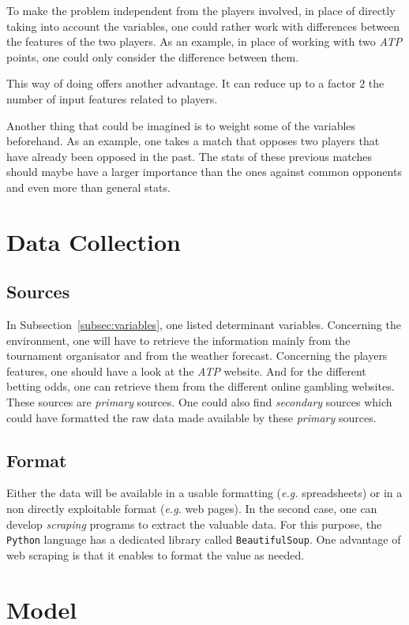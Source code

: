 \documentclass[a4paper,9pt]{report}
\theoremstyle{mytheor}
\begin{document}
To make the problem independent from the players involved, in place
of directly taking into account the variables, one could rather work
with differences between the features of the two players.
As an example, in place of working with two \textit{ATP} points,
one could only consider the difference between them.

This way of doing offers another advantage. It can reduce up to a factor $2$
the number of input features related to players.

Another thing that could be imagined is to weight some of the variables beforehand.
As an example, one takes a match that opposes two players that have already been opposed in the past.
The stats of these previous matches should maybe have a larger importance than
the ones against common opponents and even more than general stats.


\section{Data Collection}
\subsection{Sources}
In Subsection~\ref{subsec:variables}, one listed determinant variables. Concerning the environment, one will have to
retrieve the information mainly from the tournament organisator and from
the weather forecast. Concerning the players features, one should have a look at the \textit{ATP} website.
And for the different betting odds, one can retrieve them from the different online gambling websites.
These sources are \textit{primary} sources. One could also find \textit{secondary} sources which could have
formatted the raw data made available by these \textit{primary} sources.
\subsection{Format} Either the data will be available in a usable formatting (\textit{e.g.} spreadsheets)
or in a non directly exploitable format (\textit{e.g.} web pages). In the second case, one can develop \textit{scraping} programs to extract the valuable data.
For this purpose, the \texttt{Python} language has a dedicated library called \texttt{BeautifulSoup}.
One advantage of web scraping is that it enables to format the value as needed.




\section{Model}
\end{document}
